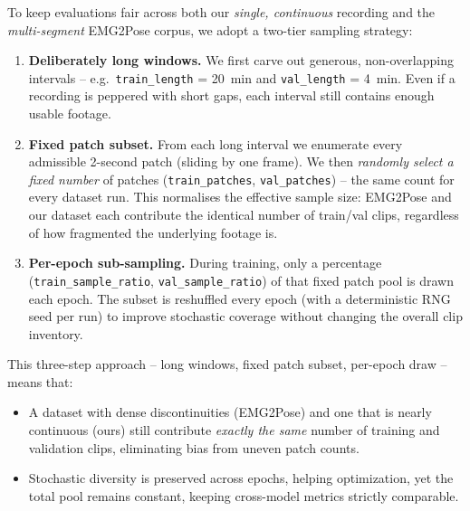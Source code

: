 To keep evaluations fair across both our \emph{single, continuous} recording
and the \emph{multi-segment} EMG2Pose corpus, we adopt a two-tier sampling
strategy:

\begin{enumerate}[label=\arabic*.]

  \item \textbf{Deliberately long windows.}
        We first carve out generous, non-overlapping intervals -- 
        e.g.\ \texttt{train\_length} = \SI{20}{min} and
        \texttt{val\_length} = \SI{4}{min}.
        Even if a recording is peppered with short gaps, each interval still
        contains enough usable footage.

  \item \textbf{Fixed patch subset.}
        From each long interval we enumerate every admissible 2-second patch
        (sliding by one frame).
        We then \emph{randomly select a fixed number} of patches
        (\texttt{train\_patches}, \texttt{val\_patches}) -- the same count for
        every dataset run.
        This normalises the effective sample size: EMG2Pose and our dataset
        each contribute the identical number of train/val clips, regardless of
        how fragmented the underlying footage is.

  \item \textbf{Per-epoch sub-sampling.}
        During training, only a percentage
        (\texttt{train\_sample\_ratio}, \texttt{val\_sample\_ratio}) of that
        fixed patch pool is drawn each epoch.
        The subset is reshuffled every epoch (with a deterministic RNG seed per
        run) to improve stochastic coverage without changing the overall clip
        inventory.

\end{enumerate}

This three-step approach -- long windows, fixed patch subset, per-epoch draw -- means
that:

\begin{itemize}
  \item A dataset with dense discontinuities (EMG2Pose) and one that is
        nearly continuous (ours) still contribute \emph{exactly the same}
        number of training and validation clips, eliminating bias from
        uneven patch counts.
  \item Stochastic diversity is preserved across epochs, helping optimization,
        yet the total pool remains constant, keeping cross-model metrics
        strictly comparable.
\end{itemize}

